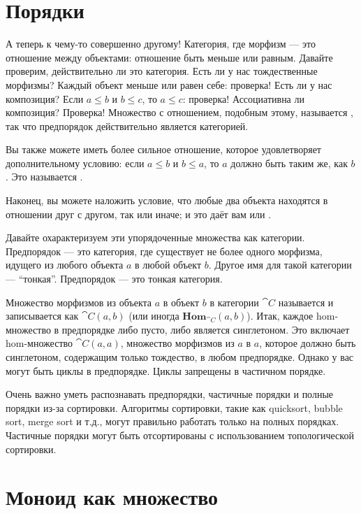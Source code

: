 \section{Порядки}

А теперь к чему-то совершенно другому! Категория, где морфизм
--- это отношение между объектами: отношение быть меньше или равным.
Давайте проверим, действительно ли это категория. Есть ли у нас тождественные морфизмы?
Каждый объект меньше или равен себе: проверка! Есть ли у нас
композиция? Если $a \leqslant b$ и $b \leqslant c$, то $a \leqslant c$: проверка! Ассоциативна ли композиция? Проверка! Множество с
отношением, подобным этому, называется , так что предпорядок действительно
является категорией.

Вы также можете иметь более сильное отношение, которое удовлетворяет дополнительному
условию: если $a \leqslant b$ и $b \leqslant a$, то $a$ должно быть
таким же, как $b$. Это называется .

Наконец, вы можете наложить условие, что любые два объекта находятся в
отношении друг с другом, так или иначе; и это даёт вам
 или .

Давайте охарактеризуем эти упорядоченные множества как категории. Предпорядок --- это
категория, где существует не более одного морфизма, идущего из любого объекта $a$ в
любой объект $b$. Другое имя для такой категории --- ``тонкая''. Предпорядок
--- это тонкая категория.

Множество морфизмов из объекта $a$ в объект $b$ в категории $\cat{C}$ называется
 и записывается как $\cat{C}(a, b)$ (или иногда
$\mathbf{Hom}_{\cat{C}}(a, b)$). Итак, каждое hom-множество в предпорядке либо
пусто, либо является синглетоном. Это включает hom-множество $\cat{C}(a, a)$, множество
морфизмов из $a$ в $a$, которое должно быть синглетоном, содержащим только
тождество, в любом предпорядке. Однако у вас могут быть циклы в предпорядке.
Циклы запрещены в частичном порядке.

Очень важно уметь распознавать предпорядки, частичные порядки
и полные порядки из-за сортировки. Алгоритмы сортировки, такие как
quicksort, bubble sort, merge sort и т.д., могут правильно работать только на
полных порядках. Частичные порядки могут быть отсортированы с использованием топологической сортировки.

\section{Моноид как множество}

